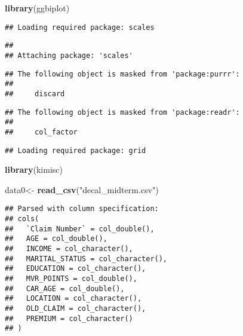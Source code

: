 \documentclass[]{article}
\newenvironment{Shaded}{\begin{snugshade}}{\end{snugshade}}
\newcommand{\KeywordTok}[1]{\textcolor[rgb]{0.13,0.29,0.53}{\textbf{#1}}}
\newcommand{\StringTok}[1]{\textcolor[rgb]{0.31,0.60,0.02}{#1}}
\newcommand{\NormalTok}[1]{#1}
\begin{document}
\begin{Shaded}
\begin{Highlighting}[]
\KeywordTok{library}\NormalTok{(ggbiplot)}
\end{Highlighting}
\end{Shaded}

\begin{verbatim}
## Loading required package: scales
\end{verbatim}

\begin{verbatim}
## 
## Attaching package: 'scales'
\end{verbatim}

\begin{verbatim}
## The following object is masked from 'package:purrr':
## 
##     discard
\end{verbatim}

\begin{verbatim}
## The following object is masked from 'package:readr':
## 
##     col_factor
\end{verbatim}

\begin{verbatim}
## Loading required package: grid
\end{verbatim}

\begin{Shaded}
\begin{Highlighting}[]
\KeywordTok{library}\NormalTok{(kimisc)}
\end{Highlighting}
\end{Shaded}

\begin{Shaded}
\begin{Highlighting}[]
\NormalTok{data0<-}\StringTok{ }\KeywordTok{read_csv}\NormalTok{(}\StringTok{"decal_midterm.csv"}\NormalTok{)}
\end{Highlighting}
\end{Shaded}

\begin{verbatim}
## Parsed with column specification:
## cols(
##   `Claim Number` = col_double(),
##   AGE = col_double(),
##   INCOME = col_character(),
##   MARITAL_STATUS = col_character(),
##   EDUCATION = col_character(),
##   MVR_POINTS = col_double(),
##   CAR_AGE = col_double(),
##   LOCATION = col_character(),
##   OLD_CLAIM = col_character(),
##   PREMIUM = col_character()
## )
\end{verbatim}
\end{document}
